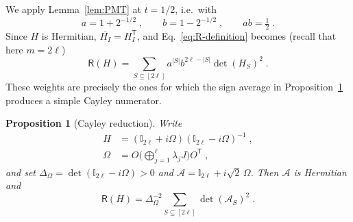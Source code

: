 \documentclass[prx,twocolumn,superscriptaddress,aps,10pt, frontmatterverbose, reprint,footinbib,longbibliography=true]{revtex4-2}
\newtheorem{proposition}{Proposition}
\newcommand{\trans}{\mathsf{T}}
\begin{document}
We apply Lemma~\ref{lem:PMT} at $t=1/2$, i.e.\ with
\begin{equation}
    a=1+2^{-1/2}\;,\qquad b=1-2^{-1/2}\;,\qquad ab=\tfrac12\;.
    \label{eq:a-b}
\end{equation}
Since $H$ is Hermitian, $\overline{H_I}=H_I^{\trans}$, and Eq.~\eqref{eq:R-definition} becomes (recall that here $m=2\ell$)
\begin{equation}
    \mathsf{R}(H)=\sum_{S\subseteq[2\ell]}a^{|S|}b^{2\ell-|S|}\det(H_S)^2\;.
    \label{eq:R-weighted-principal}
\end{equation}
These weights are precisely the ones for which the sign average in Proposition~\ref{prop:Cayley} produces a simple Cayley numerator.

\begin{proposition}[Cayley reduction]
\label{prop:Cayley}
Write
\begin{equation}
\begin{split}
    H&=(\mathbb{I}_{2\ell}+i\Omega)(\mathbb{I}_{2\ell}-i\Omega)^{-1}\;,\\ \Omega&=O\Big(\bigoplus_{j=1}^{\ell}\lambda_jJ\Big)O^{\trans}\;,
    \label{eq:H-Cayley}
\end{split}
\end{equation}
and set $\Delta_\Omega=\det(\mathbb{I}_{2\ell}-i\Omega)>0$ and $\mathcal{A}=\mathbb{I}_{2\ell}+i\sqrt2\,\Omega$. Then $\mathcal{A}$ is Hermitian and
\begin{equation}
    \mathsf{R}(H)=\Delta_\Omega^{-2}\sum_{S\subseteq[2\ell]}\det(\mathcal{A}_S)^2\;.
    \label{eq:Cayley-reduction}
\end{equation}
\end{proposition}
\end{document}
